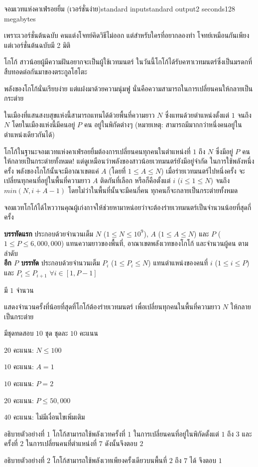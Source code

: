 \documentclass[11pt,a4paper]{article}
\begin{document}
\begin{problem}{จอมเวทแห่งคาเฟ่รอยยิ้ม (เวอร์ชั่นง่าย)}{standard input}{standard output}{2 seconds}{128 megabytes}

เพราะเวอร์ชั่นต้นฉบับ คนแต่งโจทย์คิดวิธีไม่ออก แต่สำหรับใครที่อยากลองทำ โจทย์เหมือนกันเพียงแต่เวอร์ชั่นต้นฉบับมี 2 มิติ

โกโก้ สาวน้อยผู้มีความฝันอยากจะเป็นผู้ใช้เวทมนตร์ ในวันนี้โกโก้ได้รับคฑาเวทมนตร์ซึ่งเป็นมรดกที่สืบทอดต่อกันมาของตระกูลโฮโตะ

พลังของโกโก้นั่นเรียบง่าย แต่แฝงมาด้วยความนุ่มฟู นั่นคือความสามารถในการเปลี่ยนคนให้กลายเป็นกระต่าย

ในเมืองที่แสนสงบสุขแห่งนี้สามารถแทนได้ด้วยพื้นที่ความยาว $N$ ซึ่งแทนด้วยตำแหน่งตั้งแต่ $1$ จนถึง $N$ โดยในเมืองแห่งนี้มีคนอยู่ $P$ คน อยู่ในพิกัดต่างๆ (หมายเหตุ: สามารถมีมากกว่าหนึ่งคนอยู่ในตำแหน่งเดียวกันได้)

โกโก้ในฐานะจอมเวทแห่งคาเฟ่รอยยิ้มต้องการเปลี่ยนคนทุกคนในตำแหน่งที่ $1$ ถึง $N$ ซึ่งมีอยู่ $P$ คน ให้กลายเป็นกระต่ายทั้งหมด! แต่ดูเหมือนว่าพลังของสาวน้อยเวทมนตร์ยังมีอยู่จำกัด ในการใช้พลังหนึ่งครั้ง พลังของโกโก้นั้นจะมีอาณาเขตแค่ $A$ (โดยที่ $1 \le A \le N$) เมื่อร่ายเวทมนตร์ไปหนึ่งครั้ง จะเปลี่ยนทุกคนที่อยู่ในพื้นที่ความยาว $A$ ติดกันที่เลือก หรือก็คือตั้งแต่ $i$ ($i \le 1 \le N$) จนถึง $min(N, i+A-1)$ โดยไม่ว่าในพื้นที่นั้นจะมีคนกี่คน ทุกคนก็จะกลายเป็นกระต่ายทั้งหมด

จอมเวทโกโก้ได้ไหววานคุณผู้เก่งกาจให้ช่วยหามาหน่อยว่าจะต้องร่ายเวทมนตร์เป็นจำนวนน้อยที่สุดกี่ครั้ง

\InputFile

\textbf{บรรทัดแรก} ประกอบด้วยจำนวนเต็ม $N$ ($1 \le N \le 10^9$), $A$ ($1 \le A \le N$) และ $P$ ($1 \le P \le 6,000,000$) แทนความยาวของพื้นที่, อาณาเขตพลังเวทของโกโก้ และจำนวนผู้คน ตามลำดับ \\
\textbf{อีก $P$ บรรทัด} ประกอบด้วยจำนวนเต็ม $P_i$ ($1 \le P_i \le N$) แทนตำแหน่งของคนที่ $i$ ($1 \le i \le P$) และ $P_i \le P_{i+1}$ $\forall i \in [1, P-1]$

\OutputFile
มี $1$ จำนวน

แสดงจำนวนครั้งที่น้อยที่สุดที่โกโก้ต้องร่ายเวทมนตร์ เพื่อเปลี่ยนทุกคนในพื้นที่ความยาว $N$ ให้กลายเป็นกระต่าย

\Scoring
มีชุดทดสอบ $10$ ชุด ชุดละ $10$ คะแนน

$20$ คะแนน: $N \le 100$

$10$ คะแนน: $A = 1$

$10$ คะแนน: $P = 2$

$20$ คะแนน: $P \le 50,000$

$40$ คะแนน: ไม่มีเงื่อนไขเพิ่มเติม

\Examples

\begin{example}
%
\end{example}

อธิบายตัวอย่างที่ $1$ โกโก้สามารถใช้พลังเวทครั้งที่ $1$ ในการเปลี่ยนคนที่อยู่ในพิกัดตั้งแต่ $1$ ถึง $3$ และครั้งที่ $2$ ในการเปลี่ยนคนที่ตำแหน่งที่ $7$ ดังนั้นจึงตอบ $2$

อธิบายตัวอย่างที่ $2$ โกโก้สามารถใช้พลังเวทเพียงครั้งเดียวบนพื้นที่ $2$ ถึง $7$ ได้ จึงตอบ $1$

\end{problem}
\end{document}

